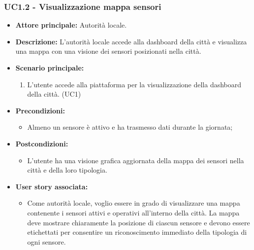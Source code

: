 \subsubsection{UC1.2 - Visualizzazione mappa sensori}
\begin{itemize}
    \item \textbf{Attore principale:} Autorità locale.
    \item \textbf{Descrizione:} L'autorità locale accede alla dashboard della città e visualizza una mappa con una visione dei sensori posizionati nella città.
    \item \textbf{Scenario principale:}
          \begin{enumerate}
            \item L'utente accede alla piattaforma per la visualizzazione della dashboard della città. (UC1)
        \end{enumerate}
    \item \textbf{Precondizioni:}
          \begin{itemize}
              \item  Almeno un sensore è attivo e ha trasmesso dati durante la giornata;
          \end{itemize}
    \item \textbf{Postcondizioni:}
          \begin{itemize}
              \item      L'utente ha una visione grafica aggiornata della mappa dei sensori nella città e della loro tipologia.
          \end{itemize}
    \item \textbf{User story associata:}
          \begin{itemize}
              \item Come autorità locale, voglio essere in grado di visualizzare una mappa contenente i sensori attivi e operativi all'interno della città. La mappa deve mostrare chiaramente la posizione di ciascun sensore e devono essere etichettati per consentire un riconoscimento immediato della tipologia di ogni sensore.
          \end{itemize}
\end{itemize}